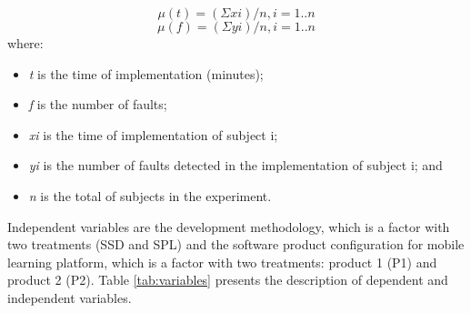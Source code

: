 \small

\begin{equation}\label{eq:1}
\mu{(t)}=(\Sigma xi)/n, i = 1..n
\end{equation}
\begin{equation}\label{eq:2}
\mu{(f)}=(\Sigma yi)/n, i = 1..n
\end{equation}
\normalsize 
where:
\begin{itemize}
\item \textit{t} is the time of implementation (minutes);
\item \textit{f} is the number of faults;
\item \textit{xi} is the time of implementation of subject i;
\item \textit{yi} is the number of faults detected in the implementation of subject i; and
\item \textit{n} is the total of subjects in the experiment.
\end{itemize}
\normalsize

Independent variables are the development methodology, which is a factor with two treatments (SSD and SPL) and the software product configuration for mobile learning platform, which is a factor with two treatments: product 1 (P1) and product 2 (P2). Table \ref{tab:variables} presents the description of dependent and independent variables.


